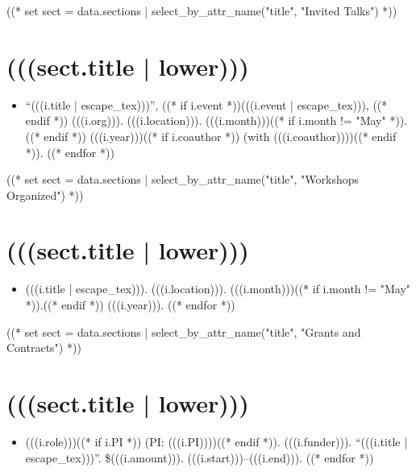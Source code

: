 \documentclass[11pt,article,oneside]{memoir}
\begin{document}
((* set sect = data.sections | select_by_attr_name("title", "Invited Talks") *))
\section{(((sect.title | lower)))}

\mbox{}\vspace{-\dimexpr\baselineskip\relax}

\begin{itemize}[label={}]
((* for i in sect.entries.talks | sort_by_attr(["year"], reverse=True) *))
\item \enquote{(((i.title | escape_tex)))}, ((* if i.event *))(((i.event | escape_tex))), ((* endif *)) (((i.org))). (((i.location))). (((i.month)))((* if i.month != "May" *)).((* endif *)) (((i.year)))((* if i.coauthor *)) (with (((i.coauthor))))((* endif *)).
((* endfor *))
\end{itemize}

((* set sect = data.sections | select_by_attr_name("title", "Workshops Organized") *))
\section{(((sect.title | lower)))}

\mbox{}\vspace{-\dimexpr\baselineskip\relax}

\begin{itemize}[label={}]
((* for i in sect.entries.workshops | sort_by_attr(["year"], reverse=True) *))
\item (((i.title | escape_tex))). (((i.location))). (((i.month)))((* if i.month != "May" *)).((* endif *)) (((i.year))).
((* endfor *))
\end{itemize}

((* set sect = data.sections | select_by_attr_name("title", "Grants and Contracts") *))
\section{(((sect.title | lower)))}

\mbox{}\vspace{-\dimexpr\baselineskip\relax}

\begin{itemize}[label={}]
((* for i in sect.entries.grants | sort_by_attr(["start"], reverse=True) *))
\item (((i.role)))((* if i.PI *)) (PI: (((i.PI))))((* endif *)). (((i.funder))). \enquote{(((i.title | escape_tex)))}. \$(((i.amount))). (((i.start)))--(((i.end))).
((* endfor *))
\end{itemize}
\end{document}
